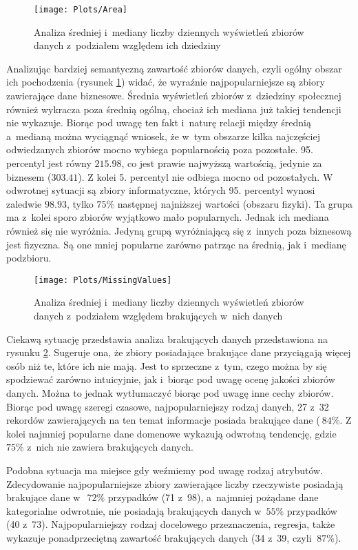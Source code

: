 \begin{figure}[ht]
  \texttt{[image: Plots/Area]}
  \caption{Analiza średniej i~mediany liczby dziennych wyświetleń zbiorów danych z~podziałem względem ich dziedziny}
  \label{fig:area}
\end{figure}

Analizując bardziej semantyczną zawartość zbiorów danych, czyli ogólny obszar ich pochodzenia (rysunek \ref{fig:area}) widać, że wyraźnie najpopularniejsze są zbiory zawierające dane biznesowe.
Średnia wyświetleń zbiorów z~dziedziny społecznej również wykracza poza średnią ogólną, chociaż ich mediana już takiej tendencji nie wykazuje.
Biorąc pod uwagę ten fakt i~naturę relacji między średnią a~medianą można wyciągnąć wniosek, że w~tym obszarze kilka najczęściej odwiedzanych zbiorów mocno wybiega popularnością poza pozostałe.
95. percentyl jest równy \(215.98\), co jest prawie najwyższą wartością, jedynie za biznesem (\(303.41\)).
Z kolei 5. percentyl nie odbiega mocno od pozostałych.
W odwrotnej sytuacji są zbiory informatyczne, których 95. percentyl wynosi zaledwie \(98.93\), tylko \(75\%\) następnej najniższej wartości (obszaru fizyki).
Ta grupa ma z~kolei sporo zbiorów wyjątkowo mało popularnych.
Jednak ich mediana również się nie wyróżnia.
Jedyną grupą wyróżniającą się z~innych poza biznesową jest fizyczna.
Są one mniej popularne zarówno patrząc na średnią, jak i~medianę podzbioru.

\begin{figure}[ht]
      \texttt{[image: Plots/MissingValues]}
      \caption{Analiza średniej i~mediany liczby dziennych wyświetleń zbiorów danych z~podziałem względem brakujących w~nich danych}
      \label{fig:missingvalues}
\end{figure}

Ciekawą sytuację przedstawia analiza brakujących danych przedstawiona na rysunku \ref{fig:missingvalues}.
Sugeruje ona, że zbiory posiadające brakujące dane przyciągają więcej osób niż te, które ich nie mają.
Jest to sprzeczne z~tym, czego można by się spodziewać zarówno intuicyjnie, jak i~biorąc pod uwagę ocenę jakości zbiorów danych.
Można to jednak wytłumaczyć biorąc pod uwagę inne cechy zbiorów.
Biorąc pod uwagę szeregi czasowe, najpopularniejszy rodzaj danych, 27 z~32 rekordów zawierających na ten temat informacje posiada brakujące dane (\(~84\%\).
Z kolei najmniej popularne dane domenowe wykazują odwrotną tendencję, gdzie \(75\%\) z~nich nie zawiera brakujących danych.

Podobna sytuacja ma miejsce gdy weźmiemy pod uwagę rodzaj atrybutów.
Zdecydowanie najpopularniejsze zbiory zawierające liczby rzeczywiste posiadają brakujące dane w~\(~72\%\) przypadków (71 z~98), a~najmniej pożądane dane kategorialne odwrotnie, nie posiadają brakujących danych w~\(55\%\) przypadków (40 z~73).
Najpopularniejszy rodzaj docelowego przeznaczenia, regresja, także wykazuje ponadprzeciętną zawartość brakujących danych (34 z~39, czyli \(~87\%\)).

